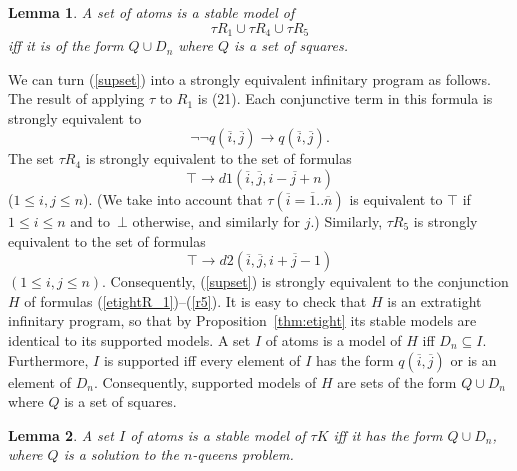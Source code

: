 \documentclass{tlp}
\def\o{\overline}
\def\rar{\rightarrow}
\def\beq{\begin{equation}}
\def\eeq#1{\label{#1}\end{equation}}
\newtheorem{lemma}{Lemma}
\begin{document}
\begin{lemma}\label{lem:sup}
A set of atoms is a stable model of
\[
\tau R_1 \cup \tau R_4 \cup \tau R_5
\tag{35}
\label{supset}
\]
iff it is of the form $Q \cup D_n$ where $Q$ is a set of squares.
\end{lemma}

\begin{proof*}
We can turn (\ref{supset}) into a strongly
equivalent infinitary program as follows. The result of applying $\tau$ to
$R_1$ is (21).
Each conjunctive term in this formula is strongly equivalent to
\[
\neg \neg q(\o i, \o j) \rar q(\o i, \o j).
\tag{36}
\label{etightR_1}
\]
The set $\tau R_4$ is strongly equivalent to
the set of formulas
\[
  \top \rar d1(\o i,\o j,\o{i-j+n})
\tag{37}
\label{r4}
\]
($1 \leq i,j \leq n$).
(We take into account that $\tau(\o i = \o 1..\o n)$ is equivalent to
$\top$ if $1 \leq i \leq n$ and to~$\bot$ otherwise, and similarly for $j$.)
Similarly, $\tau R_5$ is strongly equivalent to the set of formulas
\[
  \top \rar d2(\o i,\o j,\o{i+j-1})
\tag{38}
\label{r5}
\]
$(1 \leq i,j \leq n)$.
Consequently, (\ref{supset}) is strongly equivalent to the conjunction $H$ of
formulas (\ref{etightR_1})--(\ref{r5}).
It is easy to check that $H$ is an extratight infinitary program, so that
by Proposition~\ref{thm:etight} its stable models are identical to its
supported models.
A set $I$ of atoms is a model of $H$ iff $D_n \subseteq I$. Furthermore,
$I$ is supported iff every element of $I$ has the form $q(\o i, \o j)$ or
is an element of $D_n$. Consequently, supported models of $H$ are sets of the
form $Q \cup D_n$ where $Q$ is a set of squares.
\end{proof*}

\begin{lemma}\label{lem:main}
A set $I$ of atoms is a stable model of $\tau K$ iff
it has the form $Q \cup D_n$, where $Q$ is a solution to the $n$-queens
problem.
\end{lemma}
\end{document}

